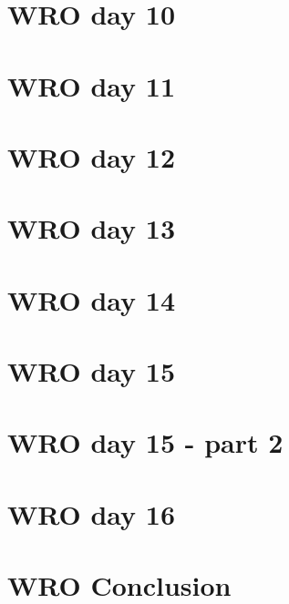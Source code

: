 \documentclass[a4paper,11pt,article,oneside]{memoir}
\begin{document}
\section{WRO day 10}

\clearpage
\section{WRO day 11}

\clearpage
\section{WRO day 12}

\clearpage
\section{WRO day 13}

\clearpage
\section{WRO day 14}

\clearpage
\section{WRO day 15}

\clearpage
\section{WRO day 15 - part 2}

\clearpage
\section{WRO day 16}

\clearpage
\section{WRO Conclusion}

\end{document}
